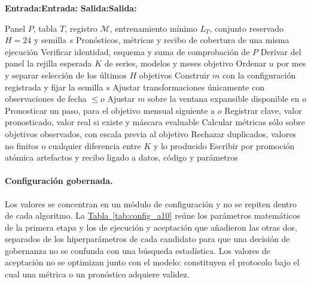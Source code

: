 \documentclass[12pt,letterpaper]{report}
\renewcommand{\algorithmicrequire}{\textbf{Entrada:}}
\renewcommand{\algorithmicensure}{\textbf{Salida:}}
\begin{document}
\begingroup
\algrenewcommand\algorithmicrequire{\textbf{Entrada:}}
\algrenewcommand\algorithmicensure{\textbf{Salida:}}
\algrenewcommand{}
\algrenewcommand{}
\algrenewcommand{}
\algrenewcommand{}
\algrenewcommand{}
\begin{algorithm}[htbp]
\caption{Implementación y acreditación del recorrido temporal}
\label{alg:implementacion_a8}
\begin{algorithmic}[1]
\Require Panel $P$, tabla $T$, registro $\mathcal{M}$, entrenamiento mínimo $L_T$,
conjunto reservado $H=24$ y semilla $s$
\Ensure Pronósticos, métricas y recibo de cobertura de una misma ejecución
\State Verificar identidad, esquema y suma de comprobación de $P$
\State Derivar del panel la rejilla esperada $K$ de series, modelos y meses objetivo
  \State Ordenar $u$ por mes y separar selección de los últimos $H$ objetivos
    \State Construir $m$ con la configuración registrada y fijar la semilla $s$
      \State Ajustar transformaciones únicamente con observaciones de fecha $\leq o$
        \State Ajustar $m$ sobre la ventana expansible disponible en $o$
      \EndIf
      \State Pronosticar un paso, para el objetivo mensual siguiente a $o$
      \State Registrar clave, valor pronosticado, valor real si existe y máscara evaluable
    \EndFor
    \State Calcular métricas sólo sobre objetivos observados, con escala previa al objetivo
  \EndFor
\EndFor
\State Rechazar duplicados, valores no finitos o cualquier diferencia entre $K$ y lo producido
\State Escribir por promoción atómica artefactos y recibo ligado a datos, código y parámetros
\end{algorithmic}
\end{algorithm}
\endgroup

\paragraph{Configuración gobernada.} Los valores se concentran en un módulo de configuración y
no se repiten dentro de cada algoritmo. La \hyperref[tab:config_a10]{Tabla~\ref*{tab:config_a10}} reúne los parámetros
matemáticos de la primera etapa y los de ejecución y aceptación que añadieron las otras dos,
separados de los hiperparámetros de cada candidato para que una decisión de gobernanza no se
confunda con una búsqueda estadística. Los valores de aceptación no se optimizan junto con el
modelo: constituyen el protocolo bajo el cual una métrica o un pronóstico adquiere validez.
\end{document}
